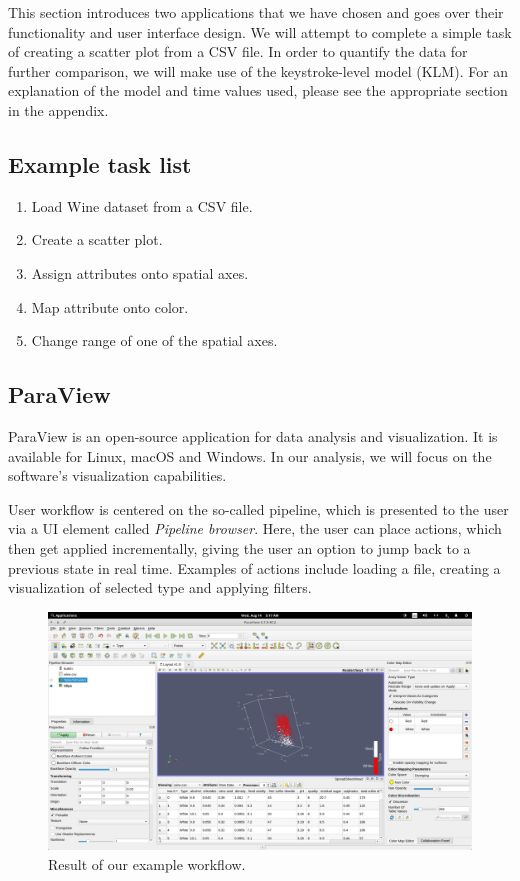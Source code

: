 \documentclass[thesis=M,english,hidelinks]{FITthesisXE}[2012/06/26]
\begin{document}
This section introduces two applications that we have chosen and goes over their functionality and user interface design. We will attempt to complete a simple task of creating a scatter plot from a CSV file. In order to quantify the data for further comparison, we will make use of the keystroke-level model (KLM).\autocite{klm} For an explanation of the model and time values used, please see the appropriate section in the appendix.

\subsection{Example task list}

\begin{enumerate}
\item Load Wine dataset from a CSV file.
\item Create a scatter plot.
\item Assign attributes onto spatial axes.
\item Map attribute onto color.
\item Change range of one of the spatial axes.

\end{enumerate}

\subsection{ParaView}

ParaView is an open-source application for data analysis and visualization.\autocite{paraview} It is available for Linux, macOS and Windows. In our analysis, we will focus on the software's visualization capabilities.

User workflow is centered on the so-called pipeline, which is presented to the user via a UI element called \emph{Pipeline browser}. Here, the user can place actions, which then get applied incrementally, giving the user an option to jump back to a previous state in real time. Examples of actions include loading a file, creating a visualization of selected type and applying filters.

\begin{figure}[ht]
\centering
\includegraphics[scale=0.2]{paraview}
\caption{Result of our example workflow.}
\label{fig:paraview}
\end{figure}
\end{document}
